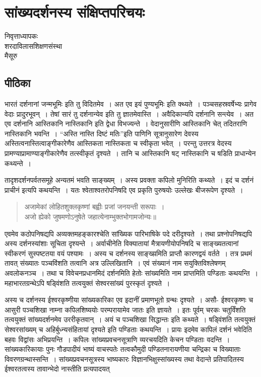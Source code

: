 {\fontsize{15}{17}\selectfont
\presetvalues
\chapter{सांख्यदर्शनस्य संक्षिप्तपरिचयः}

\begin{center}
\smallskip

निवृत्ताध्यापकः\\
शरदाविलासशिक्षणसंस्था\\
मैसूरु
\addrule
\end{center}

\section*{पीठिका}

भारतं दर्शनानां जन्मभूमिः इति तु विदितमेव~। अत एव इयं पुण्यभूमिः इति क्थ्यते~। पञ्चसहस्रवर्षेभ्यः प्रागेव वेदाः प्रादुरभूवन्~। तेषां सारं तु दर्शनान्येव इति तु ज्ञातमेवास्ति~। अवैदिकान्यपि दर्शनानि सन्त्येव~। अत एव दर्शनानि आस्तिकानि नास्तिकानि इति द्वेधा विभज्यन्ते~। वेदानुसारीणि आस्तिकानि चेत् तदितराणि नास्तिकानि भवन्ति~। “अस्ति नास्ति दिष्टं मतिः”इति पाणिनि सूत्रानुसारेण देवस्य अस्तित्वनास्तित्वाङ्गीकारेणैव आस्तिकता नास्तिकता च स्वीकृता भवेत्~। परन्तु उत्तरत्र वेदस्य प्रामण्याप्रामाण्याङ्गीकारेणैव तत्स्वीकृतं दृश्यते~। तानि च आस्तिकानि षट् नास्तिकानि च षडिति प्राधान्येन कथ्यन्ते~। 

तादृशदर्शनपर्वतसमूहे अन्यतमं भवति साङ्ख्यम्~। अस्य प्रवक्ता कपिलो मुनिरिति कथ्यते~। इदं च दर्शनं प्राचीनं इत्यपि कथयन्ति~। यतः श्वेताश्वतरोपनिषदि एव प्रकृति पुरुषयोः उल्लेखः बीजरूपेण दृश्यते~। 
\begin{verse}
अजामेकां लोहितशुक्लकृष्णां बह्वीः प्रजां जनयन्ती सरूपाः~। \\
अजो ह्येको जुषमणोऽनुषेते जहात्येनाम्भुक्तभोगामजोन्यः॥
\end{verse}
एवमेव कठोपनिषद्यपि अव्यक्तमहङ्कारश्चेति सांख्यिक पारिभाषिके पदे दरीदृश्यते~। तथा प्रश्नोपनिषद्यपि अस्य दर्शनस्यांशाः सूचिता दृश्यन्ते~। अर्वाचीनेति विक्यातायां मैत्रायणीयोपनिषदि च साङ्ख्यतत्वानां स्वीकरणं सुस्पष्टतया वयं पश्यामः~। अस्य च दर्शनस्य साङ्ख्य़मिति प्राप्तौ कारणद्वयं वर्तते~। तत्र प्रथमं तावत् संख्यातः पञ्चविंशति तत्वानि अत्र उल्लिखितानि~। एवं संख्यानं नाम सयुक्तिविश्लेषणम् अवलोकनञ्च~। तथा च विवेचनप्रधानमिदं दर्शनमिति हेतोः सांख्यमिति नाम प्राप्तमिति पण्डिताः कथयन्ति~। महाभारतग्रन्थेऽपि षड्विंशति तत्वयुक्तं सेश्वरसांख्यं पुरस्कृतं दृश्यते~। 

अस्य च दर्शनस्य ईश्वरकृष्णीया सांख्यकारिका एव इदानीं प्रमाणभूतो ग्रन्थः दृश्यते~। असौ- ईश्वरकृष्णः च आसुरी पञ्चशिखा नाम्ना कपिलशिष्ययोः परम्परायामेव जातः इति ज्ञायते~। इतः पूर्वम् चरकः चतुर्विंशति तत्वयुक्तं सांख्यदर्शनमेव उररीकृतवान्~। अयं च पञ्चशिखा सिद्धान्तः इति कथ्यते~। षड्विंशति तत्वयुक्तं सेश्वरसांख्यम् च अहिर्बुध्न्यसंहितायां दृश्यते इति पण्डिताः कथयन्ति~। प्रायः इदमेव कापिलं दर्शनं भवेदिति बहवः विद्वांसः अभिप्रयन्ति~। कपिलः सांख्यप्रवचनसूत्राणि व्यरचयदिति केचन पण्डिताः वदन्ति~। सांख्यकारिकायाः पुनः गौडपादीयं भाष्यं वाचस्पतेः तत्वकौमुदी पण्डितनारायणीया चन्द्रिका च विख्याताः विवरणग्रन्थास्सन्ति~। सांख्यप्रवचनसूत्रस्य भाष्यकारः विज्ञानभिक्षुस्सांख्यस्य तथा वेदान्ते प्रतिपादितस्य ईश्वरतत्वस्य तावान्भेदो नास्तीति प्रत्यपादयत् 

}
